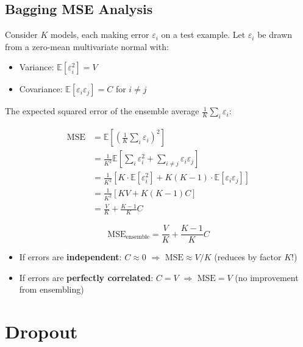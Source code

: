\documentclass[12pt,a4paper]{article}
\newcommand{\E}{\mathbb{E}}
\begin{document}
\subsection{Bagging MSE Analysis}

Consider $K$ models, each making error $\varepsilon_i$ on a test example. Let $\varepsilon_i$ be drawn from a zero-mean multivariate normal with:
\begin{itemize}
  \item Variance: $\E[\varepsilon_i^2] = V$
  \item Covariance: $\E[\varepsilon_i\varepsilon_j] = C$ for $i \neq j$
\end{itemize}

The expected squared error of the ensemble average $\frac{1}{K}\sum_i\varepsilon_i$:

\begin{align*}
  \text{MSE}
  &= \E\!\left[\left(\frac{1}{K}\sum_i\varepsilon_i\right)^2\right]\\
  &= \frac{1}{K^2}\E\!\left[\sum_i\varepsilon_i^2 + \sum_{i\neq j}\varepsilon_i\varepsilon_j\right]\\
  &= \frac{1}{K^2}\left[K\cdot\E[\varepsilon_i^2] + K(K-1)\cdot\E[\varepsilon_i\varepsilon_j]\right]\\
  &= \frac{1}{K^2}\left[KV + K(K-1)C\right]\\
  &= \frac{V}{K} + \frac{K-1}{K}C
\end{align*}

\begin{theorembox}[title={Bagging MSE}]
\[
  \text{MSE}_{\text{ensemble}} = \frac{V}{K} + \frac{K-1}{K}C
\]
\begin{itemize}
  \item If errors are \textbf{independent}: $C \approx 0$ $\Rightarrow$ $\text{MSE} \approx V/K$ (reduces by factor $K$!)
  \item If errors are \textbf{perfectly correlated}: $C = V$ $\Rightarrow$ $\text{MSE} = V$ (no improvement from ensembling)
\end{itemize}
\end{theorembox}

\section{Dropout}
\end{document}

